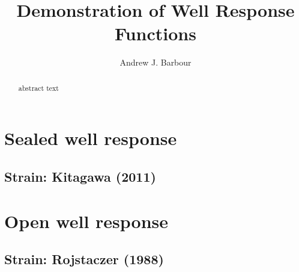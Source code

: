 \documentclass[10pt]{article}\usepackage{graphicx, color}
\author{Andrew J. Barbour}
\title{Demonstration of Well Response Functions}
\begin{document}
\maketitle
%
\newcommand{\SC}[1]{\textsc{#1}}
\newcommand{\Rcmd}[1]{\texttt{#1}}
\newcommand{\bidxa}[1]{\index{#1}{\textbf{#1}}} 
\newcommand{\bidxb}[2]{\index{#2}{\textbf{#1}}} 
\newcommand{\idxa}[1]{\index{#1}{#1}} 
\newcommand{\idxb}[2]{\index{#2}{#1}} 
%
\begin{abstract}
abstract text
\end{abstract}
%
\section{Sealed well response}
\subsection{Strain: Kitagawa (2011)}
%
\citet{kitagawa2011}

\section{Open well response}
\subsection{Strain: Rojstaczer (1988)}
%
\citet{rojstaczer1988, rojstaczer1988b}
\end{document}
